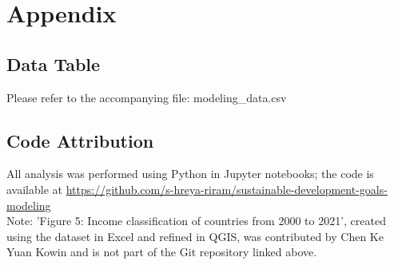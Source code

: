\documentclass[10pt,a4paper]{article}
\begin{document}
\section{Appendix}
\subsection{Data Table}
Please refer to the accompanying file: modeling\_data.csv

\subsection{Code Attribution}
All analysis was performed using Python in Jupyter notebooks; the code is available at \url{https://github.com/s-hreya-riram/sustainable-development-goals-modeling}
\\Note: 'Figure 5: Income classification of countries from 2000 to 2021', created using the dataset in Excel and refined in QGIS, was contributed by Chen Ke Yuan Kowin and is not part of the Git repository linked above.
\end{document}
